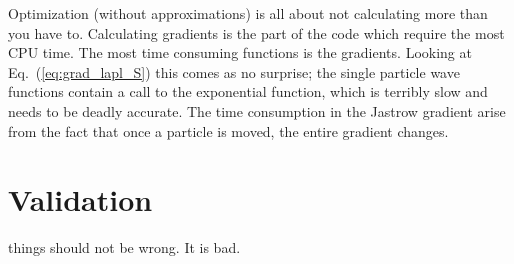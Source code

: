Optimization (without approximations) is all about not calculating more than you have to. Calculating gradients is the part of the code which require the most CPU time. The most time consuming functions is the gradients. Looking at Eq.~(\ref{eq:grad_lapl_S}) this comes as no surprise; the single particle wave functions contain a call to the exponential function, which is terribly slow and needs to be deadly accurate. The time consumption in the Jastrow gradient arise from the fact that once a particle is moved, the entire gradient changes. 

\section{Validation}

things should not be wrong. It is bad.


